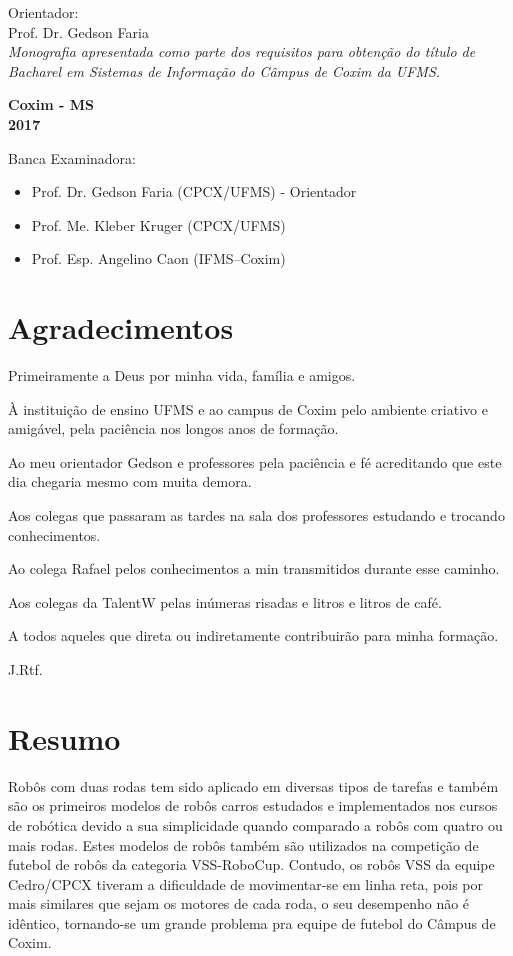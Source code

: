 \documentclass[a4paper,12pt,portuguese]{ufms-cpcx}
\begin{document}
\hspace{5.5cm}
\begin{minipage}{10cm}
			{Orientador:\\Prof. Dr. Gedson Faria}\\
			
			\textit{Monografia apresentada como parte dos requisitos para obtenção do título de Bacharel em Sistemas de Informação do Câmpus de Coxim da UFMS.}
\end{minipage}	

\begin{center}
	\vspace{10cm}
	\textbf{Coxim - MS\\ 2017}	
\end{center}


\cleardoublepage
\thispagestyle{empty}
\vspace*{15cm}
Banca Examinadora:
\begin{itemize}
	\item Prof. Dr.  Gedson Faria (CPCX/UFMS) - Orientador
	\item Prof. Me.  Kleber Kruger (CPCX/UFMS) 
	\item Prof. Esp. Angelino Caon (IFMS--Coxim)
\end{itemize}

\chapter*{Agradecimentos}
\thispagestyle{empty}
Primeiramente a Deus por minha vida, família e amigos.

À instituição de ensino UFMS e ao campus de Coxim pelo ambiente criativo e amigável, pela paciência nos longos anos de formação.

Ao meu orientador Gedson e professores pela paciência e fé acreditando que este dia chegaria mesmo com muita demora.

Aos colegas que passaram as tardes na sala dos professores estudando e trocando conhecimentos.

Ao colega Rafael pelos conhecimentos a min transmitidos durante esse caminho.

Aos colegas da TalentW pelas inúmeras risadas e litros e litros de café.

A todos aqueles que direta ou indiretamente contribuirão para minha formação.

J.Rtf.

\chapter*{Resumo}
\thispagestyle{empty}
Robôs com duas rodas tem sido aplicado em diversas tipos de tarefas e também são os primeiros modelos de robôs carros estudados e implementados nos cursos de robótica devido a sua simplicidade quando comparado a robôs com quatro ou mais rodas. Estes modelos de robôs também são utilizados na competição de futebol de robôs da categoria VSS-RoboCup. Contudo, os robôs VSS da equipe Cedro/CPCX tiveram a dificuldade de movimentar-se em linha reta, pois por mais similares que sejam os motores de cada roda, o seu desempenho não é idêntico, tornando-se um grande problema pra equipe de futebol do Câmpus de Coxim.
\end{document}
